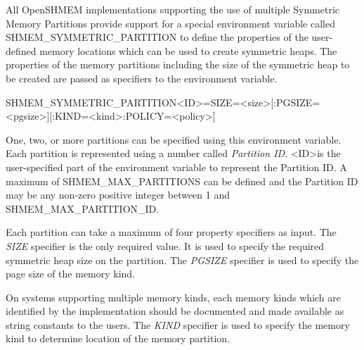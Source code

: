 All OpenSHMEM implementations supporting the use of multiple Symmetric Memory
Partitions provide support for a special environment variable called
SHMEM\_SYMMETRIC\_PARTITION to define the properties of the user-defined memory
locations which can be used to create symmetric heaps. The properties of the
memory partitions including the size of the symmetric heap to be created are
passed as specifiers to the environment variable.

\begin{envvardefinition}
\begin{envvarname}
SHMEM_SYMMETRIC_PARTITION<ID>=SIZE=<size>[:PGSIZE=<pgsize>][:KIND=<kind>:POLICY=<policy>]
\end{envvarname}

\begin{envvararguments}
\end{envvararguments}

One, two, or more partitions can be specified using this environment variable.
Each partition is represented using a number called \emph{Partition ID}.
\textless ID\textgreater is the user-specified part of the environment variable
to represent the Partition ID. A maximum of SHMEM\_MAX\_PARTITIONS can be
defined and the Partition ID may be any non-zero positive integer between 1 and
SHMEM\_MAX\_PARTITION\_ID.

Each partition can take a maximum of four property specifiers as input. The
\emph{SIZE} specifier is the only required value. It is used to specify the
required symmetric heap size on the partition. The \emph{PGSIZE} specifier is
used to specify the page size of the memory kind.

On systems supporting multiple memory kinds, each memory kinds which are
identified by the implementation should be documented and made available as
string constants to the users. The \emph{KIND} specifier is used to specify the
memory kind to determine location of the memory partition.


\end{envvardefinition}
